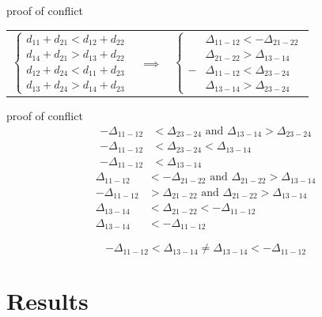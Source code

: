 \documentclass[10pt, compress]{beamer}
\begin{document}
\begin{frame}{proof of conflict}
    \begin{tabular}{c c c}
        $\begin{cases} 
        d_{11} + d_{21} < d_{12} + d_{22}\\
        d_{14} + d_{21} > d_{13} + d_{22}\\
        d_{12} + d_{24} < d_{11} + d_{23}\\
        d_{13} + d_{24} > d_{14} + d_{23}
        \end{cases}$ 
        & $\implies$ &
        $\begin{cases} 
        &\Delta_{11-12} < -\Delta_{21-22}\\
        &\Delta_{21-22} > \Delta_{13-14}\\
        -&\Delta_{11-12} < \Delta_{23-24}\\
        &\Delta_{13-14} > \Delta_{23-24}
        \end{cases}$
    \end{tabular}
\end{frame}

\begin{frame}{proof of conflict}
    \begin{align*}
        -\Delta_{11-12} &< \Delta_{23-24} \text{ and } \Delta_{13-14} > \Delta_{23-24}\\
        -\Delta_{11-12} &< \Delta_{23-24} < \Delta_{13-14}\\
        -\Delta_{11-12} &< \Delta_{13-14}
    \end{align*}
    \begin{align*}
        \Delta_{11-12} &< -\Delta_{21-22} \text{ and } \Delta_{21-22} > \Delta_{13-14}\\
        -\Delta_{11-12} &> \Delta_{21-22} \text{ and } \Delta_{21-22} > \Delta_{13-14}\\
        \Delta_{13-14} &< \Delta_{21-22} < -\Delta_{11-12}\\
        \Delta_{13-14} &< -\Delta_{11-12}
    \end{align*}
    
    \begin{equation} \label{eqation}
        -\Delta_{11-12} < \Delta_{13-14} \neq \Delta_{13-14} < -\Delta_{11-12}
    \end{equation}
\end{frame}


\section{Results}
\end{document}
